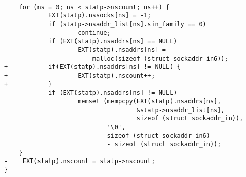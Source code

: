 \begin{lstlisting}[label={lst:hostid/malloc},firstnumber=425, caption={\texttt{hostid} crashes when \texttt{malloc} returns an error. The offending code is in the GLibC 2.23 source code, in \texttt{resolv/res\_send.c:453}.}]

    for (ns = 0; ns < statp->nscount; ns++) {
            EXT(statp).nssocks[ns] = -1;
            if (statp->nsaddr_list[ns].sin_family == 0)
                    continue;
            if (EXT(statp).nsaddrs[ns] == NULL)
                    EXT(statp).nsaddrs[ns] =
                        malloc(sizeof (struct sockaddr_in6));
+	        if(EXT(statp).nsaddrs[ns] != NULL) {
+	                EXT(statp).nscount++;
+	        }
            if (EXT(statp).nsaddrs[ns] != NULL)
                    memset (mempcpy(EXT(statp).nsaddrs[ns],
                                    &statp->nsaddr_list[ns],
                                    sizeof (struct sockaddr_in)),
                            '\0',
                            sizeof (struct sockaddr_in6)
                            - sizeof (struct sockaddr_in));
    }
-    EXT(statp).nscount = statp->nscount;
}
\end{lstlisting}